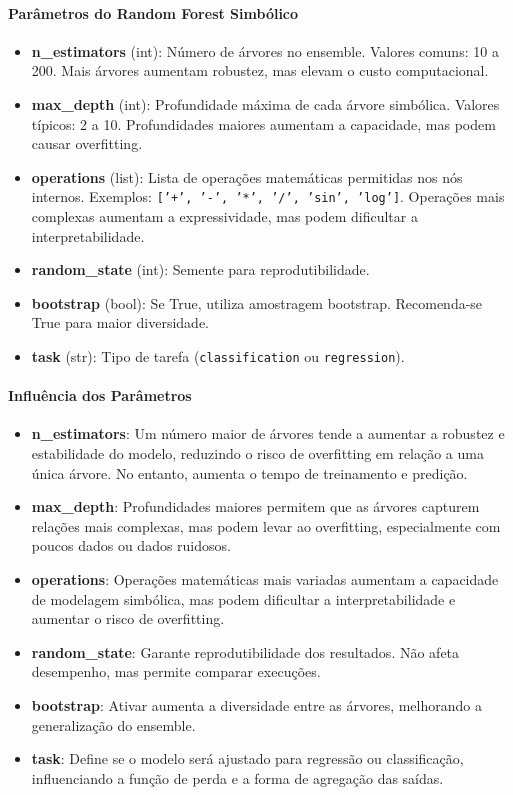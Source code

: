 \documentclass[11pt]{article}
\begin{document}
\paragraph{Parâmetros do Random Forest Simbólico}
\begin{itemize}
    \item \textbf{n\_estimators} (int): Número de árvores no ensemble. Valores comuns: 10 a 200. Mais árvores aumentam robustez, mas elevam o custo computacional.
    \item \textbf{max\_depth} (int): Profundidade máxima de cada árvore simbólica. Valores típicos: 2 a 10. Profundidades maiores aumentam a capacidade, mas podem causar overfitting.
    \item \textbf{operations} (list): Lista de operações matemáticas permitidas nos nós internos. Exemplos: \texttt{['+', '-', '*', '/', 'sin', 'log']}. Operações mais complexas aumentam a expressividade, mas podem dificultar a interpretabilidade.
    \item \textbf{random\_state} (int): Semente para reprodutibilidade.
    \item \textbf{bootstrap} (bool): Se True, utiliza amostragem bootstrap. Recomenda-se True para maior diversidade.
    \item \textbf{task} (str): Tipo de tarefa (\texttt{classification} ou \texttt{regression}).
\end{itemize}

\paragraph{Influência dos Parâmetros}
\begin{itemize}
    \item \textbf{n\_estimators}: Um número maior de árvores tende a aumentar a robustez e estabilidade do modelo, reduzindo o risco de overfitting em relação a uma única árvore. No entanto, aumenta o tempo de treinamento e predição.
    \item \textbf{max\_depth}: Profundidades maiores permitem que as árvores capturem relações mais complexas, mas podem levar ao overfitting, especialmente com poucos dados ou dados ruidosos.
    \item \textbf{operations}: Operações matemáticas mais variadas aumentam a capacidade de modelagem simbólica, mas podem dificultar a interpretabilidade e aumentar o risco de overfitting.
    \item \textbf{random\_state}: Garante reprodutibilidade dos resultados. Não afeta desempenho, mas permite comparar execuções.
    \item \textbf{bootstrap}: Ativar aumenta a diversidade entre as árvores, melhorando a generalização do ensemble.
    \item \textbf{task}: Define se o modelo será ajustado para regressão ou classificação, influenciando a função de perda e a forma de agregação das saídas.
\end{itemize}
\end{document}

